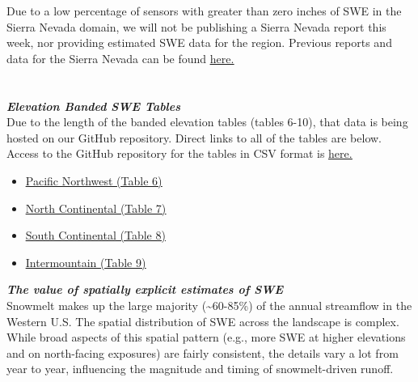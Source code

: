 \documentclass{article}
\begin{document}
\noindent Due to a low percentage of sensors with greater than zero inches of SWE in the Sierra Nevada domain, we will not be publishing a Sierra Nevada report this week, nor providing estimated SWE data for the region. Previous reports and data for the Sierra Nevada can be found \href{https://github.com/CU-Mountain-Hydrology/SierraNevada/tree/main/WY_{{ year }}}{\underline{here.}}\\

\section*{}\label{sec:elev_band_swe}
\fontsize{12}{16}
\noindent\textbf{\textit{Elevation Banded SWE Tables}}\\
\fontsize{10}{14}
\noindent Due to the length of the banded elevation tables (tables 6-10), that data is being hosted on our GitHub repository. Direct links to all of the tables are below. Access to the GitHub repository for the tables in CSV format is \href{https://github.com/CU-Mountain-Hydrology/WestWide}{\underline{here.}}
\begin{itemize}
    \item \href{https://github.com/CU-Mountain-Hydrology/WestWide/blob/main/WY_2026/PNW_{{ date }}_table06.csv}{\underline{Pacific Northwest (Table 6)}}
    \item \href{https://github.com/CU-Mountain-Hydrology/WestWide/blob/main/WY_2026/NOCN_{{ date }}_table07.csv}{\underline{North Continental (Table 7)}}
    \item \href{https://github.com/CU-Mountain-Hydrology/WestWide/blob/main/WY_2026/SOCN_{{ date }}_table08.csv}{\underline{South Continental (Table 8)}}
    \item \href{https://github.com/CU-Mountain-Hydrology/WestWide/blob/main/WY_2026/INMT_{{ date }}_table09.csv}{\underline{Intermountain (Table 9)}}
\end{itemize}

\fontsize{12}{16}
\noindent\textbf{\textit{The value of spatially explicit estimates of SWE}}\\
\fontsize{10}{14}
\noindent Snowmelt makes up the large majority (\textasciitilde60-85\%) of the annual streamflow in the Western U.S. The spatial distribution of SWE across the landscape is complex. While broad aspects of this spatial pattern (e.g., more SWE at higher elevations and on north-facing exposures) are fairly consistent, the details vary a lot from year to year, influencing the magnitude and timing of snowmelt-driven runoff.\\
\end{document}
